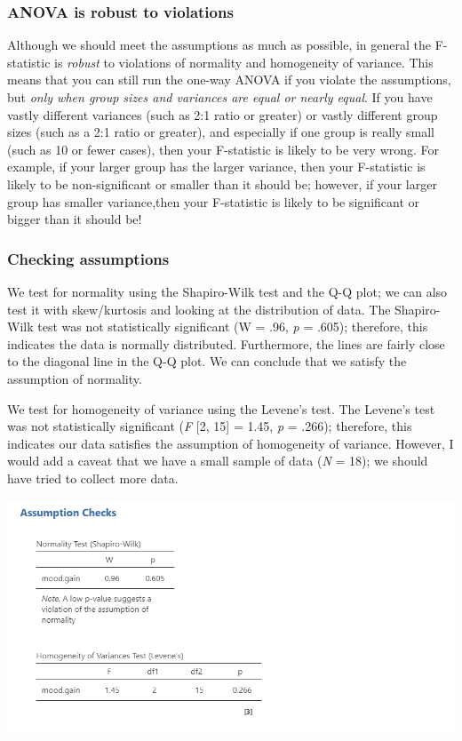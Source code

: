 \documentclass[
]{book}
\begin{document}
\hypertarget{anova-is-robust-to-violations}{%
\subsubsection{ANOVA is robust to violations}\label{anova-is-robust-to-violations}}

Although we should meet the assumptions as much as possible, in general the F-statistic is \emph{robust} to violations of normality and homogeneity of variance. This means that you can still run the one-way ANOVA if you violate the assumptions, but \emph{only when group sizes and variances are equal or nearly equal}. If you have vastly different variances (such as 2:1 ratio or greater) or vastly different group sizes (such as a 2:1 ratio or greater), and especially if one group is really small (such as 10 or fewer cases), then your F-statistic is likely to be very wrong. For example, if your larger group has the larger variance, then your F-statistic is likely to be non-significant or smaller than it should be; however, if your larger group has smaller variance,then your F-statistic is likely to be significant or bigger than it should be!

\hypertarget{checking-assumptions-4}{%
\subsubsection{Checking assumptions}\label{checking-assumptions-4}}

We test for normality using the Shapiro-Wilk test and the Q-Q plot; we can also test it with skew/kurtosis and looking at the distribution of data. The Shapiro-Wilk test was not statistically significant (W = .96, \emph{p} = .605); therefore, this indicates the data is normally distributed. Furthermore, the lines are fairly close to the diagonal line in the Q-Q plot. We can conclude that we satisfy the assumption of normality.

We test for homogeneity of variance using the Levene's test. The Levene's test was not statistically significant (\emph{F} {[}2, 15{]} = 1.45, \emph{p} = .266); therefore, this indicates our data satisfies the assumption of homogeneity of variance. However, I would add a caveat that we have a small sample of data (\emph{N} = 18); we should have tried to collect more data.

\includegraphics{images/04_one-way-anova/one-way_assumptions1.png}
\end{document}
